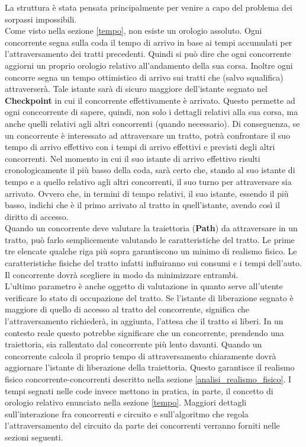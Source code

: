 La struttura è stata pensata principalmente per venire a capo del problema dei sorpassi impossibili.\\
Come visto nella sezione \ref{tempo}, non esiste un orologio assoluto. Ogni concorrente segna sulla
coda il tempo di arrivo in base ai tempi accumulati per l'attraversamento dei tratti precedenti. Quindi si può dire che ogni
concorrente aggiorni un proprio orologio relativo all'andamento della sua corsa. Inoltre ogni concorre segna
un tempo ottimistico di arrivo sui tratti che (salvo squalifica) attraverserà. Tale istante sarà di sicuro maggiore dell'istante segnato
nel \textbf{Checkpoint} in cui il concorrente effettivamente è arrivato. Questo permette ad ogni conccorrente di sapere, quindi, non solo
i dettagli relativi alla sua corsa, ma anche quelli relativi agli altri concorrenti (quando necessario). Di conseguenza, se un concorrente
è interessato ad attraversare un tratto, potrà confrontare il suo tempo di arrivo effettivo con i tempi di arrivo effettivi e previsti
degli altri concorrenti. Nel momento in cui il suo istante di arrivo effettivo risulti cronologicamente il più basso della coda, sarà certo
che, stando al suo istante di tempo e a quello relativo agli altri concorrenti, il suo turno per attraversare sia arrivato. Ovvero che, in 
termini di tempo relativi, il suo istante, essendo il più basso, indichi che è il primo arrivato al tratto in quell'istante, avendo così
il diritto di accesso.\\
Quando un concorrente deve valutare la traiettoria (\textbf{Path}) da attraversare in un tratto, può farlo semplicemente valutando le caratteristiche
del tratto. Le prime tre elencate qualche riga più sopra garantiscono un minimo di realismo fisico. Le caratteristiche fisiche del tratto infatti
influiranno sui consumi e i tempi dell'auto. Il concorrente dovrà scegliere in modo da minimizzare entrambi.\\
L'ultimo parametro è anche oggetto di valutazione in quanto serve all'utente verificare lo stato di occupazione del tratto. Se l'istante
di liberazione segnato è maggiore di quello di accesso al tratto del concorrente, significa che l'attraversamento richiederà, in aggiunta, 
l'attesa che il tratto si liberi. In un contesto reale questo potrebbe significare che un concorrente, prendendo una traiettoria, sia rallentato
dal concorrente più lento davanti. Quando un concorrente calcola il proprio tempo di attraversamento chiaramente dovrà aggiornare l'istante
di liberazione della traiettoria. Questo garantisce il realismo fisico concorrente-concorrenti descritto nella sezione \ref{analisi_realismo_fisico}.
I tempi segnati nelle code invece mettono in pratica, in parte, il concetto di orologio relativo enunciato nella sezione \ref{tempo}.
Maggiori dettagli sull'interazione fra concorrenti e circuito e sull'algoritmo che regola l'attraversamento del circuito da parte dei concorrenti
verranno forniti nelle sezioni seguenti.
